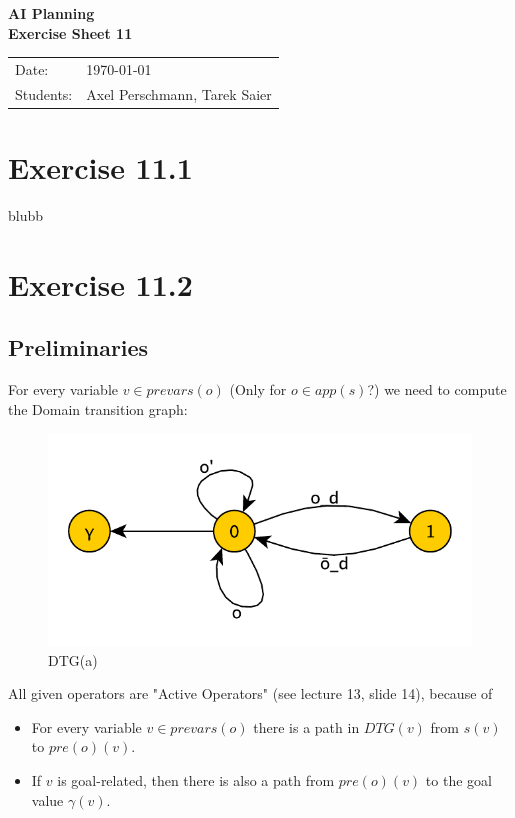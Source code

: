 \documentclass[11pt,a4paper]{article}
\newcommand{\sheetNr}{11}
\begin{document}
\begin{center}
\Huge{\textbf{AI Planning}}\\
\LARGE{\textbf{Exercise Sheet \sheetNr}}
\end{center}
\vspace{2cm}
\begin{tabular}{ll}
Date: & \today\\
Students: & Axel Perschmann, Tarek Saier
\end{tabular}

\section*{Exercise 11.1}
blubb

\section*{Exercise 11.2}

\subsection*{Preliminaries}
For every variable $ v \in prevars(o) $ (Only for $o \in app(s)$?) we need to compute the Domain transition graph:
\begin{figure}[h!]
\centering
\includegraphics[scale=0.5]{DTG_a}
\caption{DTG(a)}
\end{figure}

All given operators are "Active Operators" (see lecture 13, slide 14), because of
\begin{itemize}
\item For every variable $v \in prevars(o)$ there is a path in $DTG(v)$ from $s(v)$ to $pre(o)(v)$.
\item If $v$ is goal-related, then there is also a path from $pre(o)(v)$ to the goal value $\gamma(v)$.
\end{itemize}
\end{document}
